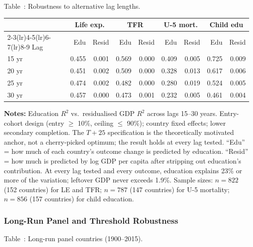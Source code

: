 \documentclass[12pt,letterpaper]{article}
\begin{document}
{\label{tab:a2}Table~\thetable: Robustness to alternative lag lengths.

\begin{longtable}[]{@{}lrrrrrrrr@{}}
\toprule
& \multicolumn{2}{c}{Life exp.} & \multicolumn{2}{c}{TFR}
& \multicolumn{2}{c}{U-5 mort.} & \multicolumn{2}{c}{Child edu} \\
\cmidrule(lr){2-3}\cmidrule(lr){4-5}\cmidrule(lr){6-7}\cmidrule(lr){8-9}
Lag & Edu & Resid & Edu & Resid & Edu & Resid & Edu & Resid \\
\midrule
\endhead
15 yr & 0.455 & 0.001 & 0.569 & 0.000 & 0.409 & 0.005 & 0.725 & 0.009 \\
20 yr & 0.451 & 0.002 & 0.509 & 0.000 & 0.328 & 0.013 & 0.617 & 0.006 \\
25 yr & 0.474 & 0.002 & 0.482 & 0.000 & 0.280 & 0.019 & 0.524 & 0.005 \\
30 yr & 0.457 & 0.000 & 0.473 & 0.001 & 0.232 & 0.005 & 0.461 & 0.004 \\
\bottomrule
\end{longtable}

\begin{minipage}{\dimexpr\textwidth-2em}
\scriptsize
\textbf{Notes:} Education $R^2$ vs.~residualised GDP $R^2$ across
lags 15--30 years. Entry-cohort design (entry $\geq$ 10\%, ceiling
$\leq$ 90\%); country fixed effects; lower secondary completion. The
$T{+}25$ specification is the theoretically motivated anchor, not a
cherry-picked optimum; the result holds at every lag tested. ``Edu''
= how much of each country's outcome change is predicted by
education. ``Resid'' = how much is predicted by log GDP per capita
after stripping out education's contribution. At every lag tested
and every outcome, education explains 23\% or more of the variation;
leftover GDP never exceeds 1.9\%. Sample sizes: $n=822$ (152
countries) for LE and TFR; $n=787$ (147 countries) for U-5
mortality; $n=856$ (157 countries) for child education.
\end{minipage}

\subsubsection{Long-Run Panel and Threshold Robustness}\label{appendix-threshold-long-run}

\label{tab:a3}Table~\thetable: Long-run panel countries (1900--2015).

}
\end{document}

